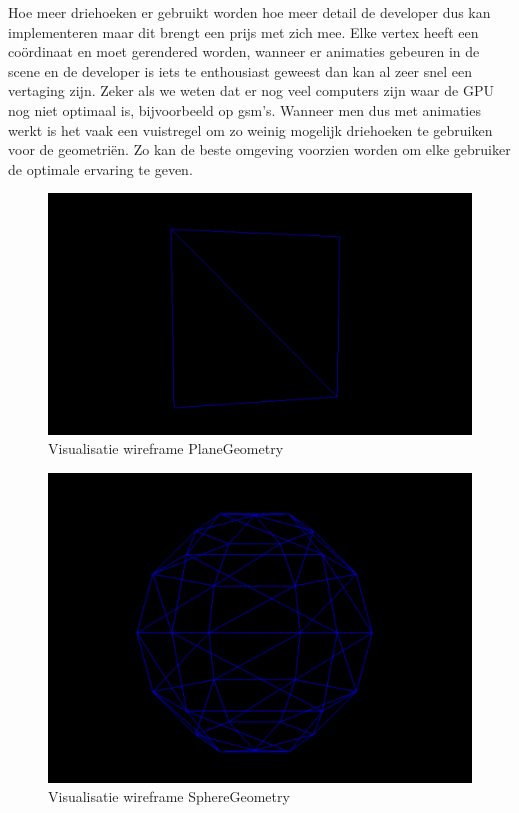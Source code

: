 Hoe meer driehoeken er gebruikt worden hoe meer detail de developer dus kan implementeren maar dit brengt een prijs met zich mee. Elke vertex heeft een coördinaat en moet gerendered worden, wanneer er animaties gebeuren in de scene en de developer is iets te enthousiast geweest dan kan al zeer snel een vertaging zijn. Zeker als we weten dat er nog veel computers zijn waar de GPU nog niet optimaal is, bijvoorbeeld op gsm's. Wanneer men dus met animaties werkt is het vaak een vuistregel om zo weinig mogelijk driehoeken te gebruiken voor de geometriën. Zo kan de beste omgeving voorzien worden om elke gebruiker de optimale ervaring te geven.

\begin{figure}[h]
	\centering
	\includegraphics[width=1\linewidth]{graphics/planeGeometry}
	\caption[Visualisatie wireframe PlaneGeometry]{Visualisatie wireframe PlaneGeometry}
	\label{fig:planeGeometry}
\end{figure}

\begin{figure}[]
	\centering
	\includegraphics[width=1\linewidth]{graphics/sphereGeometry}
	\caption[Visualisatie wireframe SphereGeometry]{Visualisatie wireframe SphereGeometry}
	\label{fig:sphereGeometry}
\end{figure}

